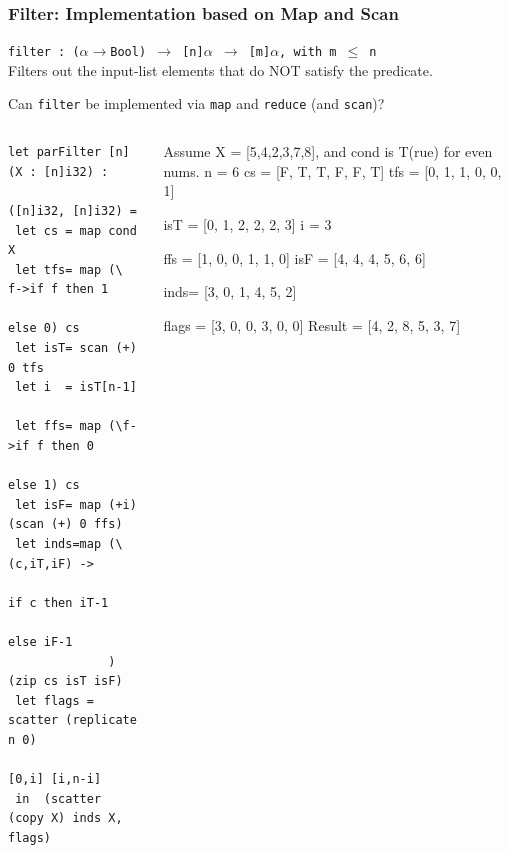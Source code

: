\documentclass{beamer}
\renewcommand{\emph}[1]{\textcolor{structure}{#1}}
\newcommand{\emp}[1]{\textcolor{DikuRed}{ #1}}
\newcommand{\mymath}[1]{$ #1 $}
\newcommand{\myindu}[1]{^{#1}}
\begin{document}
\begin{frame}[fragile,t]
  \frametitle{Filter: Implementation based on Map and Scan}


\emph{\tt filter : ($\alpha\rightarrow$Bool) $\rightarrow$ [n]$\alpha$ $\rightarrow$ [m]$\alpha$, with m $\leq$ n}\\
Filters out the input-list elements that do NOT satisfy the predicate.

\alert{Can {\tt filter} be implemented via {\tt map} and {\tt reduce} (and {\tt scan})?}\pause


\begin{columns}
  \lstset{basicstyle=\scriptsize}
  \begin{lstlisting}
let parFilter [n] (X : [n]i32) : 
              ([n]i32, [n]i32) =
 let cs = map cond X
 let tfs= map (\ f->if f then 1 
                         else 0) cs
 let isT= scan (+) 0 tfs
 let i  = isT[n-1]

 let ffs= map (\f->if f then 0 
                        else 1) cs
 let isF= map (+i) (scan (+) 0 ffs)
 let inds=map (\(c,iT,iF) -> 
                  if c then iT-1 
                       else iF-1
              ) (zip cs isT isF)
 let flags = scatter (replicate n 0) 
                     [0,i] [i,n-i]
 in  (scatter (copy X) inds X, flags)
\end{lstlisting}
  \lstset{basicstyle=\small}
%
%
\vspace{-2ex}
\begin{colorcode}[fontsize=\scriptsize]
Assume X = [5,4,2,3,7,8], and 
cond is T(rue) for even nums.\pause
n   = 6
cs  = [F, T, T, F, F, T]
tfs = [0, 1, 1, 0, 0, 1]

isT = [0, 1, 2, 2, 2, 3]
i   = 3

ffs = [1, 0, 0, 1, 1, 0]
isF = [4, 4, 4, 5, 6, 6]

inds= [3, 0, 1, 4, 5, 2]


flags  = [3, 0, 0, 3, 0, 0]
Result = [4, 2, 8, 5, 3, 7] 
\end{colorcode}
\end{columns}

\end{frame}
\end{document}
